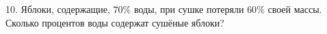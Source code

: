 10. Яблоки, содержащие, $70\%$ воды, при сушке потеряли $60\%$ своей массы. Сколько
процентов воды содержат сушёные яблоки?\\
